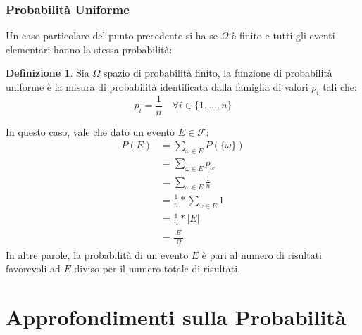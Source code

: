\documentclass{article}
\theoremstyle{plain}
\theoremstyle{definition}
\newtheorem{definizione}{Definizione}[section]
\theoremstyle{remark}
\begin{document}
\subsubsection{Probabilità Uniforme} %
\label{subs:probabilità_uniforme}
Un caso particolare del punto precedente si ha se $\Omega$ è finito e tutti gli eventi elementari hanno la stessa probabilità:
\begin{definizione}
	Sia $\Omega$ spazio di probabilità finito, la funzione di probabilità uniforme è la misura di probabilità identificata dalla famiglia di valori $p_i$ tali che:
	\begin{equation*}
		p_i=\frac{1}{n}\quad\forall i\in\{1,...,n\}
	\end{equation*}
\end{definizione}
In questo caso, vale che dato un evento $E\in\mathscr{F}:$
\begin{align*}
	P(E)&=\sum_{\omega\in E} P(\{\omega\})\\
	&=\sum_{\omega\in E} p_\omega\\
	&=\sum_{\omega\in E} \frac{1}{n}\\
	&=\frac{1}{n}*\sum_{\omega\in E} 1\\
	&=\frac{1}{n}*\lvert E\rvert\\
	&=\frac{\lvert E\rvert}{\lvert\Omega\rvert}
\end{align*}
In altre parole, la probabilità di un evento $E$ è pari al numero di risultati favorevoli ad $E$ diviso per il numero totale di risultati.
\section{Approfondimenti sulla Probabilità} %
\label{sec:approfondimenti_sulla_probabilità}
\end{document}

